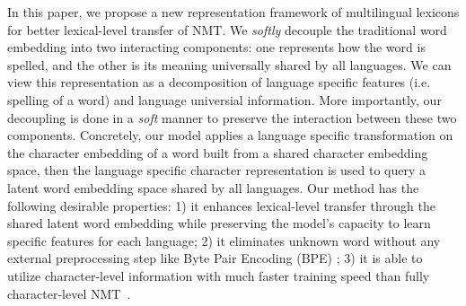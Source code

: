 In this paper, we propose a new representation framework of multilingual lexicons for better lexical-level transfer of NMT. We \textit{softly} decouple the traditional word embedding into two interacting components: one represents how the word is spelled, and the other is its meaning universally shared by all languages. We can view this representation as a decomposition of language specific features (i.e. spelling of a word) and language universial information. More importantly, our decoupling is done in a \textit{soft} manner to preserve the interaction between these two components. Concretely, our model applies a language specific transformation on the character embedding of a word built from a shared character embedding space, then the language specific character representation is used to query a latent word embedding space shared by all languages. Our method has the following desirable properties: 1) it enhances lexical-level transfer through the shared latent word embedding while preserving the model's capacity to learn specific features for each language; 2) it eliminates unknown word without any external preprocessing step like Byte Pair Encoding (BPE) \citep{bpe}; 3) it is able to utilize character-level information with much faster training speed than fully character-level NMT~\citep{}.

